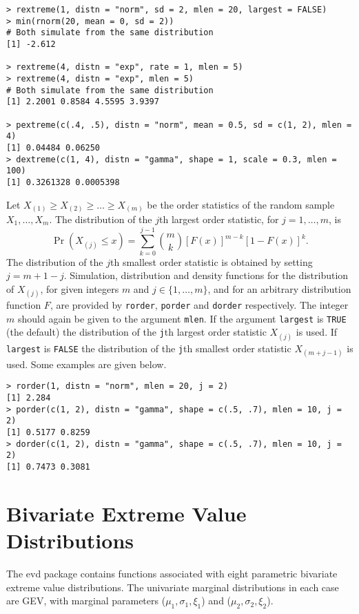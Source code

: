 \documentclass[11pt,a4paper]{article}
\begin{document}
\begin{verbatim}
> rextreme(1, distn = "norm", sd = 2, mlen = 20, largest = FALSE)
> min(rnorm(20, mean = 0, sd = 2))
# Both simulate from the same distribution
[1] -2.612

> rextreme(4, distn = "exp", rate = 1, mlen = 5)
> rextreme(4, distn = "exp", mlen = 5)
# Both simulate from the same distribution
[1] 2.2001 0.8584 4.5595 3.9397

> pextreme(c(.4, .5), distn = "norm", mean = 0.5, sd = c(1, 2), mlen = 4)
[1] 0.04484 0.06250
> dextreme(c(1, 4), distn = "gamma", shape = 1, scale = 0.3, mlen = 100)
[1] 0.3261328 0.0005398
\end{verbatim}

Let $X_{(1)} \geq X_{(2)} \geq \dots \geq X_{(m)}$ be the order statistics of the random sample $X_1,\dots,X_m$.
The distribution of the $j$th largest order statistic, for $j = 1,\dots,m$, is
\begin{equation}
\Pr(X_{(j)} \leq x) = \sum_{k=0}^{j-1} \binom{m}{k} [F(x)]^{m-k} [1 - F(x)]^k.
\label{orderdens}
\end{equation}
The distribution of the $j$th smallest order statistic is obtained by setting $j = m + 1 - j$.
Simulation, distribution and density functions for the distribution of $X_{(j)}$, for given integers $m$ and $j \in \{1,\dots,m\}$, and for an arbitrary distribution function $F$, are provided by \verb+rorder+, \verb+porder+ and \verb+dorder+ respectively.
The integer $m$ should again be given to the argument \verb+mlen+.
If the argument \verb+largest+ is \verb+TRUE+ (the default) the distribution of the \verb+j+th largest order statistic $X_{(j)}$ is used.
If \verb+largest+ is \verb+FALSE+ the distribution of the \verb+j+th smallest order statistic $X_{(m+j-1)}$ is used.
Some examples are given below.

\begin{verbatim}
> rorder(1, distn = "norm", mlen = 20, j = 2)
[1] 2.284
> porder(c(1, 2), distn = "gamma", shape = c(.5, .7), mlen = 10, j = 2)
[1] 0.5177 0.8259
> dorder(c(1, 2), distn = "gamma", shape = c(.5, .7), mlen = 10, j = 2)
[1] 0.7473 0.3081
\end{verbatim}

\section{Bivariate Extreme Value Distributions}
\setcounter{footnote}{0}
\label{biv}

The evd package contains functions associated with eight parametric bivariate extreme value distributions.
The univariate marginal distributions in each case are GEV, with marginal parameters ($\mu_1,\sigma_1,\xi_1$) and ($\mu_2,\sigma_2,\xi_2$).
\end{document}
